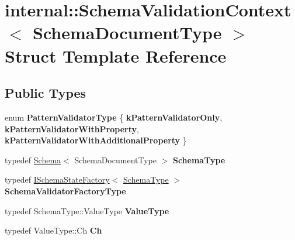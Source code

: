 \hypertarget{structinternal_1_1SchemaValidationContext}{}\section{internal\+:\+:Schema\+Validation\+Context$<$ Schema\+Document\+Type $>$ Struct Template Reference}
\label{structinternal_1_1SchemaValidationContext}
\subsection*{Public Types}
\begin{DoxyCompactItemize}
\item 
enum {\bfseries Pattern\+Validator\+Type} \{ {\bfseries k\+Pattern\+Validator\+Only}, 
{\bfseries k\+Pattern\+Validator\+With\+Property}, 
{\bfseries k\+Pattern\+Validator\+With\+Additional\+Property}
 \}\hypertarget{structinternal_1_1SchemaValidationContext_a4fb1b8fe7ecb9d4608e6b0ac0716826c}{}\label{structinternal_1_1SchemaValidationContext_a4fb1b8fe7ecb9d4608e6b0ac0716826c}

\item 
typedef \hyperlink{classinternal_1_1Schema}{Schema}$<$ Schema\+Document\+Type $>$ {\bfseries Schema\+Type}\hypertarget{structinternal_1_1SchemaValidationContext_a79b155ab3711b97b6e33ced450614397}{}\label{structinternal_1_1SchemaValidationContext_a79b155ab3711b97b6e33ced450614397}

\item 
typedef \hyperlink{classinternal_1_1ISchemaStateFactory}{I\+Schema\+State\+Factory}$<$ \hyperlink{classinternal_1_1Schema}{Schema\+Type} $>$ {\bfseries Schema\+Validator\+Factory\+Type}\hypertarget{structinternal_1_1SchemaValidationContext_a33fa91fd8e880d1adb9b891fe441f110}{}\label{structinternal_1_1SchemaValidationContext_a33fa91fd8e880d1adb9b891fe441f110}

\item 
typedef Schema\+Type\+::\+Value\+Type {\bfseries Value\+Type}\hypertarget{structinternal_1_1SchemaValidationContext_acc134e808d3a4dbe8834eb1a3e98e816}{}\label{structinternal_1_1SchemaValidationContext_acc134e808d3a4dbe8834eb1a3e98e816}

\item 
typedef Value\+Type\+::\+Ch {\bfseries Ch}\hypertarget{structinternal_1_1SchemaValidationContext_abd905cd1513b117f1db68b58d6c41daf}{}\label{structinternal_1_1SchemaValidationContext_abd905cd1513b117f1db68b58d6c41daf}

\end{DoxyCompactItemize}
